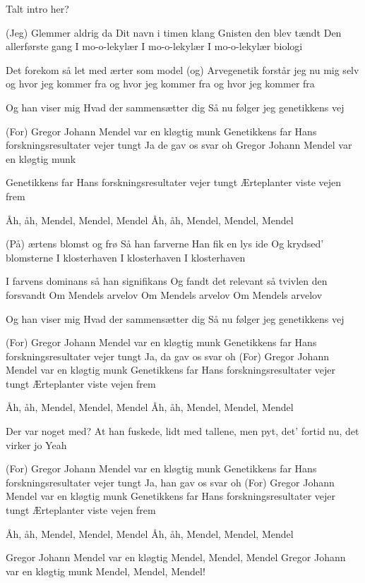 \message{ !name(mendel.tex)}\documentclass[a4paper,11pt]{article}
\begin{document}
\begin{song}
\scene Talt intro her?

(Jeg) Glemmer aldrig da 
Dit navn i timen klang
Gnisten den blev tændt
Den allerførste gang
I mo-o-lekylær
I mo-o-lekylær
I mo-o-lekylær biologi

Det forekom så let
med ærter som model
(og) Arvegenetik
forstår jeg nu mig selv
og hvor jeg kommer fra
og hvor jeg kommer fra
og hvor jeg kommer fra

Og han viser mig
Hvad der sammensætter dig
Så nu følger jeg genetikkens vej

(For) Gregor Johann Mendel var en kløgtig munk
Genetikkens far
Hans forskningsresultater vejer tungt 
Ja de gav os svar oh 
Gregor Johann Mendel var en kløgtig munk 

Genetikkens far
Hans forskningsresultater vejer tungt 
Ærteplanter viste vejen frem

Åh, åh, Mendel, Mendel, Mendel
Åh, åh, Mendel, Mendel, Mendel

(På) ærtens blomst og frø
Så han farverne
Han fik en lys ide 
Og krydsed' blomsterne
I klosterhaven
I klosterhaven
I klosterhaven


I farvens dominans
så han signifikans 
Og fandt det relevant
så tvivlen den forsvandt
Om Mendels arvelov
Om Mendels arvelov 
Om Mendels arvelov 

Og han viser mig
Hvad der sammensætter dig
Så nu følger jeg genetikkens vej

(For) Gregor Johann Mendel var en kløgtig munk 
Genetikkens far 
Hans forskningsresultater vejer tungt
Ja, da gav os svar oh
(For) Gregor Johann Mendel var en kløgtig munk 
Genetikkens far 
Hans forskningsresultater vejer tungt 
Ærteplanter viste vejen frem

Åh, åh, Mendel, Mendel, Mendel
Åh, åh, Mendel, Mendel, Mendel


Der var noget med? At han fuskede,
lidt med tallene, men pyt, det' fortid nu,
det virker jo
Yeah

(For) Gregor Johann Mendel var en kløgtig munk
Genetikkens far 
Hans forskningsresultater vejer tungt 
Ja, han gav os svar oh
(For) Gregor Johann Mendel var en kløgtig munk 
Genetikkens far 
Hans forskningsresultater vejer tungt 
Ærteplanter viste vejen frem

Åh, åh, Mendel, Mendel, Mendel
Åh, åh, Mendel, Mendel, Mendel


Gregor Johann Mendel var en kløgtig 
Mendel, Mendel, Mendel 
Gregor Johann var en kløgtig munk 
Mendel, Mendel, Mendel! 

\end{song}
\end{document}
